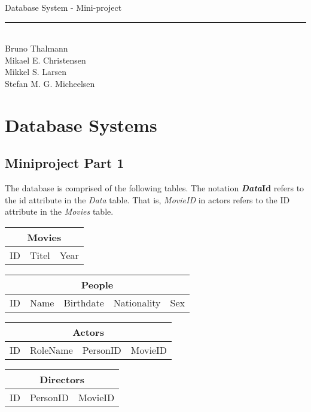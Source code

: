 
\newcommand{\HRule}{\rule{\linewidth}{0.5mm}}


\begin{titlepage}
\centering
{\LARGE Database System - Mini-project}
\HRule \\[0.5cm]
Bruno Thalmann\\
			Mikael E. Christensen\\
			Mikkel S. Larsen\\
			Stefan M. G. Micheelsen
\end{titlepage}

\chapter*{Database Systems}

\section{Miniproject Part 1}
The database is comprised of the following tables.
The notation \textbf{\textit{Data}Id} refers to the id attribute in the \textit{Data} table.
That is, \textit{MovieID} in actors refers to the ID attribute in the \textit{Movies} table.

\noindent\begin{tabular}{|l|l|l|}
\hline
\multicolumn{3}{|c|}{Movies} \\ \hline
ID & Titel & Year \\ \hline
\end{tabular}

\noindent\begin{tabular}{|l|l|l|l|l|}
\hline
\multicolumn{5}{|c|}{People} \\ \hline
ID & Name & Birthdate & Nationality & Sex \\ \hline
\end{tabular}

\noindent\begin{tabular}{|l|l|l|l|}
\hline
\multicolumn{4}{|c|}{Actors} \\ \hline
ID & RoleName & PersonID & MovieID \\ \hline
\end{tabular}

\noindent\begin{tabular}{|l|l|l|}
\hline
\multicolumn{3}{|c|}{Directors} \\ \hline
ID & PersonID & MovieID \\ \hline
\end{tabular}

